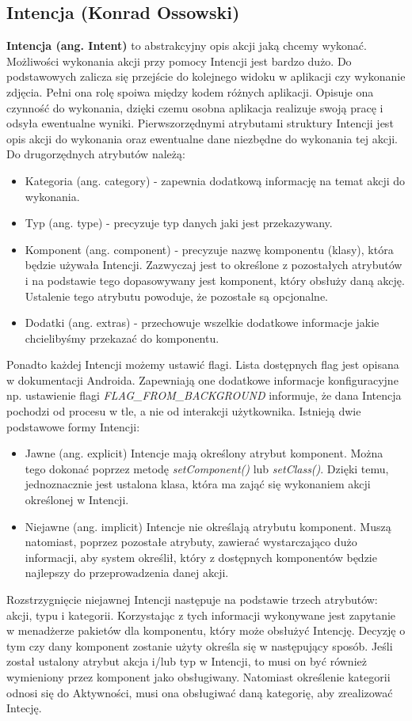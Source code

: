 \subsection{Intencja (Konrad Ossowski)}
\textbf{Intencja (ang. Intent)} to abstrakcyjny opis akcji jaką chcemy wykonać. Możliwości wykonania akcji przy pomocy Intencji jest bardzo dużo. Do podstawowych zalicza się przejście do kolejnego widoku w aplikacji czy wykonanie zdjęcia. Pełni ona rolę spoiwa między kodem różnych aplikacji. Opisuje ona czynność do wykonania, dzięki czemu osobna aplikacja realizuje swoją pracę i odsyła ewentualne wyniki. Pierwszorzędnymi atrybutami struktury Intencji jest opis akcji do wykonania oraz ewentualne dane niezbędne do wykonania tej akcji. Do drugorzędnych atrybutów należą:
\begin{itemize}
\item Kategoria (ang. category) - zapewnia dodatkową informację na temat akcji do wykonania.
\item Typ (ang. type) - precyzuje typ danych jaki jest przekazywany.
\item Komponent (ang. component) - precyzuje nazwę komponentu (klasy), która będzie używała Intencji. Zazwyczaj jest to określone z pozostałych atrybutów i na podstawie tego dopasowywany jest komponent, który obsłuży daną akcję. Ustalenie tego atrybutu powoduje, że pozostałe są opcjonalne.
\item Dodatki (ang. extras) - przechowuje wszelkie dodatkowe informacje jakie chcielibyśmy przekazać do komponentu.
\end{itemize}
Ponadto każdej Intencji możemy ustawić flagi. Lista dostępnych flag jest opisana w dokumentacji Androida. Zapewniają one dodatkowe informacje konfiguracyjne np. ustawienie flagi \textit{FLAG\_FROM\_BACKGROUND} informuje, że dana Intencja pochodzi od procesu w tle, a nie od interakcji użytkownika.
Istnieją dwie podstawowe formy Intencji:
\begin{itemize}
    \item Jawne (ang. explicit) Intencje mają określony atrybut komponent. Można tego dokonać poprzez metodę \textit{setComponent()} lub \textit{setClass()}. Dzięki temu, jednoznacznie jest ustalona klasa, która ma zająć się wykonaniem akcji określonej w Intencji.
    \item Niejawne (ang. implicit) Intencje nie określają atrybutu komponent. Muszą natomiast, poprzez pozostałe atrybuty, zawierać wystarczająco dużo informacji, aby system określił, który z dostępnych komponentów będzie najlepszy do przeprowadzenia danej akcji.
\end{itemize}
Rozstrzygnięcie niejawnej Intencji następuje na podstawie trzech atrybutów: akcji, typu i kategorii. Korzystając z tych informacji wykonywane jest zapytanie w menadżerze pakietów dla komponentu, który może obsłużyć Intencję. Decyzję o tym czy dany komponent zostanie użyty określa się w następujący sposób. Jeśli został ustalony atrybut akcja i/lub typ w Intencji, to musi on być również wymieniony przez komponent jako obsługiwany.  Natomiast określenie kategorii odnosi się do Aktywności, musi ona obsługiwać daną kategorię, aby zrealizować Intecję.\cite{intent}
